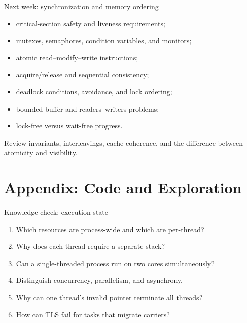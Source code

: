 \documentclass[aspectratio=169,11pt]{beamer}
\begin{document}
\begin{frame}{Next week: synchronization and memory ordering}
  \begin{itemize}
    \item critical-section safety and liveness requirements;
    \item mutexes, semaphores, condition variables, and monitors;
    \item atomic read--modify--write instructions;
    \item acquire/release and sequential consistency;
    \item deadlock conditions, avoidance, and lock ordering;
    \item bounded-buffer and readers--writers problems;
    \item lock-free versus wait-free progress.
  \end{itemize}
  \begin{tcolorbox}[title=Preparation,colback=osgreen!5,colframe=osgreen!70]
    Review invariants, interleavings, cache coherence, and the difference between atomicity and visibility.
  \end{tcolorbox}
\end{frame}

\appendix
\section{Appendix: Code and Exploration}

\begin{frame}{Knowledge check: execution state}
  \begin{enumerate}
    \item Which resources are process-wide and which are per-thread?
    \item Why does each thread require a separate stack?
    \item Can a single-threaded process run on two cores simultaneously?
    \item Distinguish concurrency, parallelism, and asynchrony.
    \item Why can one thread's invalid pointer terminate all threads?
    \item How can TLS fail for tasks that migrate carriers?
  \end{enumerate}
\end{frame}
\end{document}
